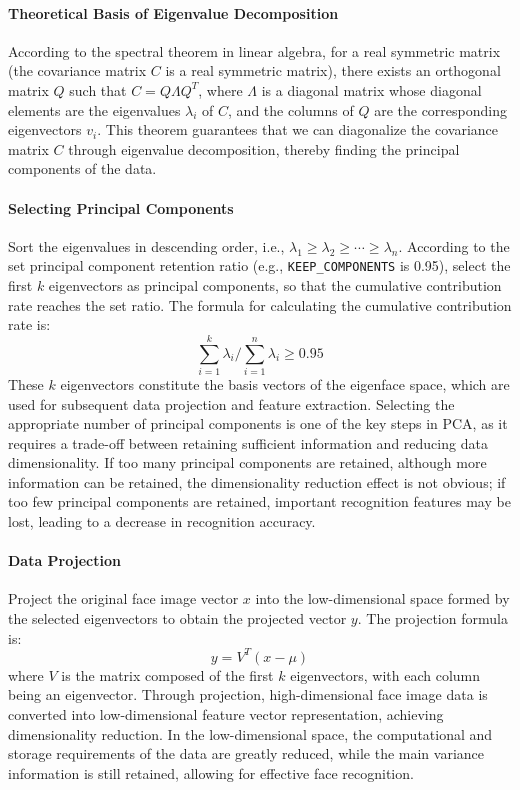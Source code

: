\documentclass{article}
\begin{document}
\paragraph{Theoretical Basis of Eigenvalue Decomposition}
According to the spectral theorem in linear algebra, for a real symmetric matrix (the covariance matrix \( C \) is a real symmetric matrix), there exists an orthogonal matrix \( Q \) such that \( C = Q \Lambda Q^T \), where \( \Lambda \) is a diagonal matrix whose diagonal elements are the eigenvalues \( \lambda_i \) of \( C \), and the columns of \( Q \) are the corresponding eigenvectors \( v_i \). This theorem guarantees that we can diagonalize the covariance matrix \( C \) through eigenvalue decomposition, thereby finding the principal components of the data.

\paragraph{Selecting Principal Components}
Sort the eigenvalues in descending order, i.e., \( \lambda_1 \geq \lambda_2 \geq \cdots \geq \lambda_n \). According to the set principal component retention ratio (e.g., \texttt{KEEP\_COMPONENTS} is 0.95), select the first \( k \) eigenvectors as principal components, so that the cumulative contribution rate reaches the set ratio. The formula for calculating the cumulative contribution rate is:
\[
\sum_{i=1}^{k} \lambda_i / \sum_{i=1}^{n} \lambda_i \geq 0.95
\]
These \( k \) eigenvectors constitute the basis vectors of the eigenface space, which are used for subsequent data projection and feature extraction. Selecting the appropriate number of principal components is one of the key steps in PCA, as it requires a trade-off between retaining sufficient information and reducing data dimensionality. If too many principal components are retained, although more information can be retained, the dimensionality reduction effect is not obvious; if too few principal components are retained, important recognition features may be lost, leading to a decrease in recognition accuracy.

\paragraph{Data Projection}
Project the original face image vector \( x \) into the low-dimensional space formed by the selected eigenvectors to obtain the projected vector \( y \). The projection formula is:
\[
y = V^T (x - \mu)
\]
where \( V \) is the matrix composed of the first \( k \) eigenvectors, with each column being an eigenvector. Through projection, high-dimensional face image data is converted into low-dimensional feature vector representation, achieving dimensionality reduction. In the low-dimensional space, the computational and storage requirements of the data are greatly reduced, while the main variance information is still retained, allowing for effective face recognition.
\end{document}
